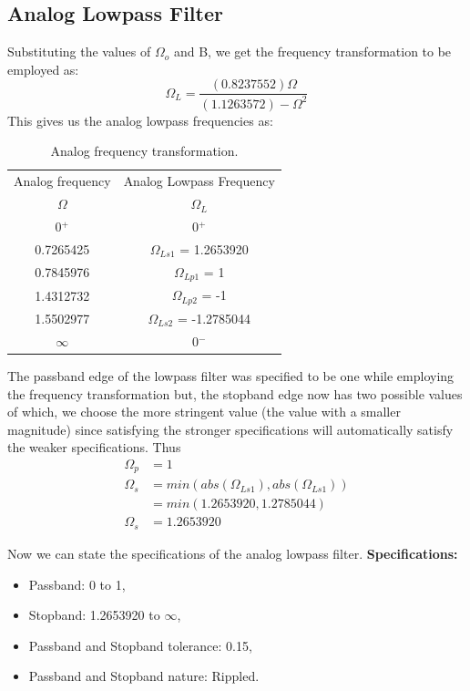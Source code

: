 \documentclass[12pt]{article}
\begin{document}
\subsection{Analog Lowpass Filter}
Substituting the values of $\Omega_o$ and B, we get the frequency transformation to be employed as:
\[\Omega_L = \frac{(0.8237552)\Omega}{(1.1263572) - \Omega^2}\]
This gives us the analog lowpass frequencies as:
\begin{table}[!h]
    \centering
    \begin{tabular}{|c|c|}\hline
         Analog frequency&Analog Lowpass Frequency\\
         $\Omega$ &$\Omega_L$\\\hline
         0$^+$&0$^+$\\\hline
         0.7265425&$\Omega_{Ls1}$ = 1.2653920\\\hline
         0.7845976&$\Omega_{Lp1}$ = 1\\\hline
         1.4312732&$\Omega_{Lp2}$ = -1\\\hline
         1.5502977&$\Omega_{Ls2}$ = -1.2785044\\\hline
         $\infty$&0$^-$\\\hline
    \end{tabular}
    \caption{Analog frequency transformation.}
    \label{tab:3}
\end{table}

The passband edge of the lowpass filter was specified to be one while employing the frequency transformation but, the stopband edge now has two possible values of which, we choose the more stringent value (the value with a smaller magnitude) since satisfying the stronger specifications will automatically satisfy the weaker specifications. Thus
\begin{align*}
    \Omega_p &= 1\\
    \Omega_s &= min(abs(\Omega_{Ls1}), abs(\Omega_{Ls1}))\\
    &= min(1.2653920, 1.2785044)\\
    \Omega_s &= 1.2653920
\end{align*}

Now we can state the specifications of the analog lowpass filter.
\newline
\hline
\vspace{10pt}
\textbf{Specifications:}
\begin{itemize}
    \item Passband: 0 to 1,
    \item Stopband: 1.2653920 to  $\infty$,
    \item Passband and Stopband tolerance: 0.15,
    \item Passband and Stopband nature: Rippled.
\end{itemize}
\hline
\newpage
\end{document}
